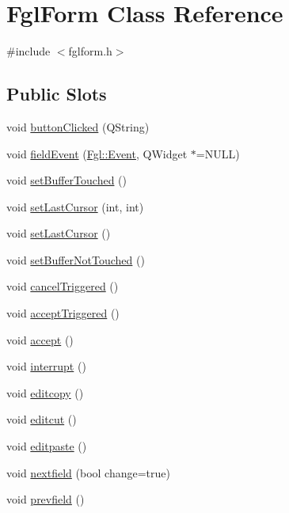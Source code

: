 \hypertarget{classFglForm}{
\section{FglForm Class Reference}
\label{classFglForm}
}


{\ttfamily \#include $<$fglform.h$>$}

\subsection*{Public Slots}
\begin{DoxyCompactItemize}
\item 
void \hyperlink{classFglForm_a0ee0e2722721bf18a2809e670e0777cf}{buttonClicked} (QString)
\item 
void \hyperlink{classFglForm_a1fd5cabc8ec447738e4420f618d69ca7}{fieldEvent} (\hyperlink{structFgl_1_1Event}{Fgl::Event}, QWidget $\ast$=NULL)
\item 
void \hyperlink{classFglForm_a763db4c754333829447f9766c25f0e0b}{setBufferTouched} ()
\item 
void \hyperlink{classFglForm_a8495f6c9444756a6bdf370c3ce158921}{setLastCursor} (int, int)
\item 
void \hyperlink{classFglForm_ab61a1af085f68fa6673e516812b0b9c8}{setLastCursor} ()
\item 
void \hyperlink{classFglForm_a7146bdb938bcb9a88b23051b39ea19b7}{setBufferNotTouched} ()
\item 
void \hyperlink{classFglForm_a21cf637edb3ad010d7e00e4d20b95825}{cancelTriggered} ()
\item 
void \hyperlink{classFglForm_afd623938967b4f76707704ab67032a57}{acceptTriggered} ()
\item 
void \hyperlink{classFglForm_a2300cda82ffb223096c19f63004e248f}{accept} ()
\item 
void \hyperlink{classFglForm_a0e2bda025291fc5a29a74254418cffdb}{interrupt} ()
\item 
void \hyperlink{classFglForm_ac51ab1764a0c88802875af3b0ef890af}{editcopy} ()
\item 
void \hyperlink{classFglForm_acba6e2dba68f2d8c8354a1f3e7de0213}{editcut} ()
\item 
void \hyperlink{classFglForm_a3bbc33d5de6401f21553a0e09e091292}{editpaste} ()
\item 
void \hyperlink{classFglForm_a1a279ed4bf3d729f30a346e8e6c9b8c7}{nextfield} (bool change=true)
\item 
void \hyperlink{classFglForm_a1a8413bf151ffd1e9fb4b0ae2a78dd6e}{prevfield} ()

\end{DoxyCompactItemize}
